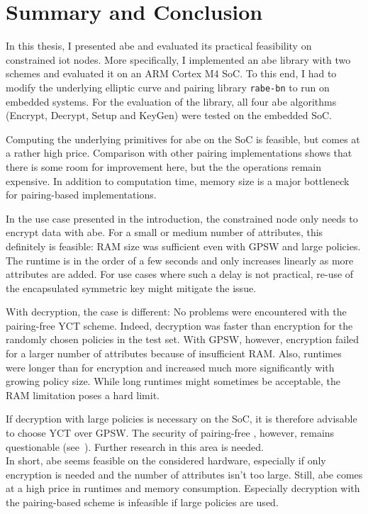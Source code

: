 \chapter{Summary and Conclusion}

In this thesis, I presented \acrshort{abe} and evaluated its practical feasibility on constrained \acrshort{iot} nodes.
More specifically, I implemented an \acrfull{abe} library with two schemes and evaluated it on an ARM Cortex M4 SoC.
To this end, I had to modify the underlying elliptic curve and pairing library \texttt{rabe-bn} to run on embedded systems.
For the evaluation of the library, all four \acrshort{abe} algorithms (Encrypt, Decrypt, Setup and KeyGen) were tested on the embedded SoC.

Computing the underlying primitives for \acrshort{abe} on the SoC is feasible, but comes at a rather high price.
Comparison with other pairing implementations shows that there is some room for improvement here, but the the operations remain expensive.
In addition to computation time, memory size is a major bottleneck for pairing-based implementations.

In the use case presented in the introduction, the constrained node only needs to encrypt data with \acrshort{abe}.
For a small or medium number of attributes, this definitely is feasible:
RAM size was sufficient even with GPSW and large policies.
The runtime is in the order of a few seconds and only increases linearly as more attributes are added.
For use cases where such a delay is not practical, re-use of the encapsulated symmetric key might mitigate the issue.

With decryption, the case is different: 
No problems were encountered with the pairing-free YCT scheme.
Indeed, decryption was faster than encryption for the randomly chosen policies in the test set.
With GPSW, however, encryption failed for a larger number of attributes because of insufficient RAM.
Also, runtimes were longer than for encryption and increased much more significantly with growing policy size.
While long runtimes might sometimes be acceptable, the RAM limitation poses a hard limit.

If decryption with large policies is necessary on the SoC, it is therefore advisable to choose YCT over GPSW.
The security of pairing-free , however, remains questionable (see~\cite{herranz_attacking_2020}).
Further research in this area is needed.\\

In short, \acrfull{abe} seems feasible on the considered hardware, especially if only encryption is needed and the number of attributes isn't too large.
Still, \acrshort{abe} comes at a high price in runtimes and memory consumption.
Especially decryption with the pairing-based scheme is infeasible if large policies are used.

